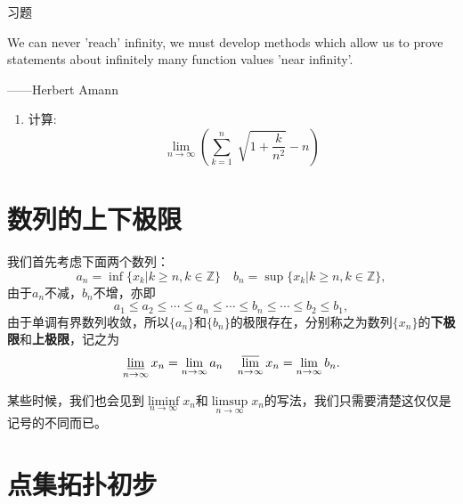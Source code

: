 	\vspace{2ex}
	\centerline{\heiti \Large 习题}

	\vspace{2ex}
	{We can never 'reach' infinity, we must develop methods which allow us to prove statements about infinitely many function values 'near infinity'.}
	\begin{flushright}
    	——Herbert Amann
	\end{flushright}
	\begin{enumerate}
		\item 计算:$$\lim\limits_{n\to\infty}\left(\sum_{k=1}^{n}\sqrt[]{1+\frac{k}{n^2}}-n\right)$$
	\end{enumerate}

	\section{数列的上下极限}
	我们首先考虑下面两个数列：\[a_n=\inf\{x_k|k\geq n,k\in\mathbb{Z}\}\enspace\enspace b_n=\sup\{x_k|k\geq n,k\in\mathbb{Z}\},\]由于\(a_n\)不减，\(b_n\)不增，亦即\[a_1\leq a_2\leq\cdots\leq a_n\leq\cdots\leq b_n\leq\cdots\leq b_2\leq b_1,\]由于单调有界数列收敛，所以\(\{a_n\}\)和\(\{b_n\}\)的极限存在，分别称之为数列\(\{x_n\}\)的\textbf{下极限}和\textbf{上极限}，记之为\[\varliminf\limits_{n\to\infty}x_n=\lim\limits_{n\to\infty}a_n\enspace\enspace\varlimsup\limits_{n\to\infty}x_n=\lim\limits_{n\to\infty}b_n.\]
	
	某些时候，我们也会见到\(\liminf\limits_{n\to\infty}x_n\)和\(\limsup\limits_{n\to\infty}x_n\)的写法，我们只需要清楚这仅仅是记号的不同而已。
	\section{点集拓扑初步}
	\begin{theorem}
		
	\end{theorem}
	
	